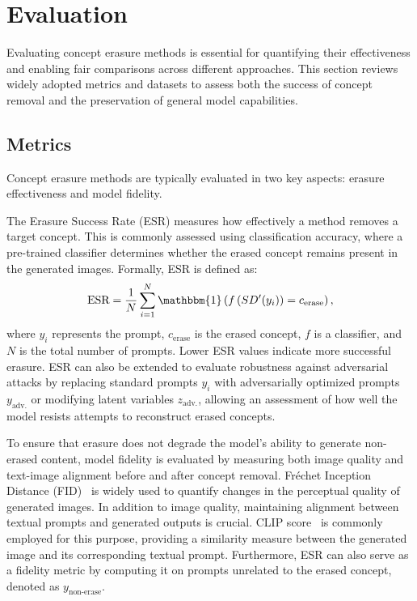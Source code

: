 \section{Evaluation} \label{sec:evaluation}
Evaluating concept erasure methods is essential for quantifying their effectiveness and enabling fair comparisons across different approaches. This section reviews widely adopted metrics and datasets to assess both the success of concept removal and the preservation of general model capabilities.

\subsection{Metrics}
Concept erasure methods are typically evaluated in two key aspects: erasure effectiveness and model fidelity. 

The Erasure Success Rate (ESR) measures how effectively a method removes a target concept. This is commonly assessed using classification accuracy, where a pre-trained classifier determines whether the erased concept remains present in the generated images. Formally, ESR is defined as:
\begin{equation}\label{eq:esr}
    \text{ESR} = \frac{1}{N} \sum_{i=1}^{N} \mathbbm{1}\left( f\left(SD'(y_i)\right) = c_{\text{erase}} \right),
\end{equation}
where \( y_i \) represents the prompt, \( c_{\text{erase}} \) is the erased concept, \( f \) is a classifier, and \( N \) is the total number of prompts. Lower ESR values indicate more successful erasure. ESR can also be extended to evaluate robustness against adversarial attacks by replacing standard prompts \( y_i \) with adversarially optimized prompts \( y_{\text{adv.}} \) or modifying latent variables \( z_{\text{adv.}} \), allowing an assessment of how well the model resists attempts to reconstruct erased concepts.

To ensure that erasure does not degrade the model's ability to generate non-erased content, model fidelity is evaluated by measuring both image quality and text-image alignment before and after concept removal. Fréchet Inception Distance (FID)~\cite{fid} is widely used to quantify changes in the perceptual quality of generated images. In addition to image quality, maintaining alignment between textual prompts and generated outputs is crucial. CLIP score~\cite{hessel2021clipscore} is commonly employed for this purpose, providing a similarity measure between the generated image and its corresponding textual prompt. Furthermore, ESR can also serve as a fidelity metric by computing it on prompts unrelated to the erased concept, denoted as \( y_{\text{non-erase}} \).


